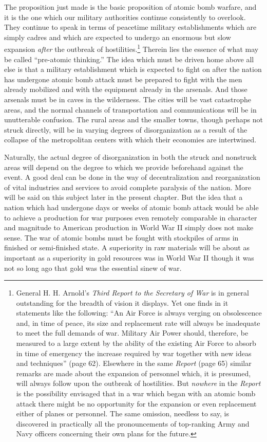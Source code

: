 The proposition just made is the basic proposition of atomic bomb warfare, and it is the one which our military authorities continue consistently to overlook. They continue to speak in terms of peacetime military establishments which are simply cadres and which are expected to undergo an enormous but slow expansion \emph{after} the outbreak of hostilities.\footnote{General H. H. Arnold's \textit{Third Report to the Secretary of War} is in general outstanding for the breadth of vision it displays. Yet one finds in it statements like the following: ``An Air Force is always verging on obsolescence and, in time of peace, its size and replacement rate will always be inadequate to meet the full demands of war. Military Air Power should, therefore, be measured to a large extent by the ability of the existing Air Force to absorb in time of emergency the increase required by war together with new ideas and techniques'' (page 62). Elsewhere in the same \textit{Report} (page 65) similar remarks are made about the expansion of personnel which, it is presumed, will always follow upon the outbreak of hostilities. But \emph{nowhere} in the \textit{Report} is the possibility envisaged that in a war which began with an atomic bomb attack there might be no opportunity for the expansion or even replacement either of planes or personnel. The same omission, needless to say, is discovered in practically all the pronouncements of top-ranking Army and Navy officers concerning their own plans for the future.} Therein lies the essence of what may be called ``pre-atomic thinking.'' The idea which must be driven home above all else is that a military establishment which is expected to fight on after the nation has undergone atomic bomb attack must be prepared to fight with the men already mobilized and with the equipment already in the arsenals. And those arsenals must be in caves in the wilderness. The cities will be vast catastrophe areas, and the normal channels of transportation and communications will be in unutterable confusion. The rural areas and the smaller towns, though perhaps not struck directly, will be in varying degrees of disorganization as a result of the collapse of the metropolitan centers with which their economies are intertwined.

Naturally, the actual degree of disorganization in both the struck and nonstruck areas will depend on the degree to which we provide beforehand against the event. A good deal can be done in the way of decentralization and reorganization of vital industries and services to avoid complete paralysis of the nation. More will be said on this subject later in the present chapter. But the idea that a nation which had undergone days or weeks of atomic bomb attack would be able to achieve a production for war purposes even remotely comparable in character and magnitude to American production in World War II simply does not make sense. The war of atomic bombs must be fought with stockpiles of arms in finished or semi-finished state. A superiority in raw materials will be about as important as a superiority in gold resources was in World War II though it was not so long ago that gold was the essential sinew of war.

